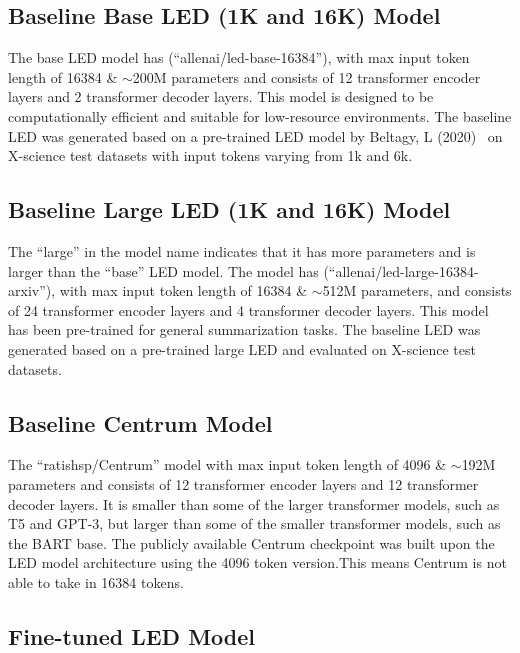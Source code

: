 \documentclass[12pt, twocolumn]{article}
\numberwithin{equation}{section}
\begin{document}
\subsection{Baseline Base LED (1K and 16K) Model}
\label{app:model-base-led}

The base LED model has (``allenai/led-base-16384''), with max input token length of 16384 \& $\sim$200M parameters and consists of 12 transformer encoder layers and 2 transformer decoder layers. This model is designed to be computationally efficient and suitable for low-resource environments. The baseline LED was generated based on a pre-trained LED model by Beltagy, L (2020)~\cite{beltagy2020longformer} on X-science test datasets with input tokens varying from 1k and 6k. 

\subsection{Baseline Large LED (1K and 16K) Model}
\label{app:model-large-led}

The ``large'' in the model name indicates that it has more parameters and is larger than the ``base'' LED model. The model has (``allenai/led-large-16384-arxiv''), with max input token length of 16384 \& $\sim$512M parameters, and consists of 24 transformer encoder layers and 4 transformer decoder layers. This model has been pre-trained for general summarization tasks. The baseline LED was generated based on a pre-trained large LED and evaluated on X-science test datasets.

\subsection{Baseline Centrum Model}
\label{app:model-centrum}

The ``ratishsp/Centrum'' model with max input token length of 4096 \& $\sim$192M parameters and consists of 12 transformer encoder layers and 12 transformer decoder layers. It is smaller than some of the larger transformer models, such as T5 and GPT-3, but larger than some of the smaller transformer models, such as the BART base. The publicly available Centrum checkpoint was built upon the LED model architecture using the 4096 token version.This means Centrum is not able to take in 16384 tokens.

\subsection{Fine-tuned LED Model}
\label{app:model-ft-led}
\end{document}
